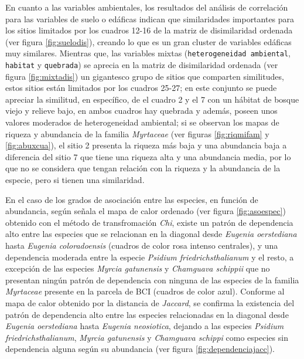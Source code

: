 \documentclass[11pt,]{article}
\begin{document}
En cuanto a las variables ambientales, los resultados del análisis de
correlación para las variables de suelo o edáficas indican que
similaridades importantes para los sitios limitados por los cuadros
12-16 de la matriz de disimilaridad ordenada (ver figura
\ref{fig:suelodis}), creando lo que es un gran cluster de variables
edáficas muy similares. Mientras que, las variables mixtas
(\texttt{heterogeneidad\ ambiental}, \texttt{habitat} y
\texttt{quebrada}) se aprecia en la matriz de disimilaridad ordenada
(ver figura \ref{fig:mixtadis}) un gigantesco grupo de sitios que
comparten similitudes, estos sitios están limitados por los cuadros
25-27; en este conjunto se puede apreciar la similitud, en específico,
de el cuadro 2 y el 7 con un hábitat de bosque viejo y relieve bajo, en
ambos cuadros hay quebrada y además, poseen unos valores moderados de
heterogeneidad ambiental; si se observan los mapas de riqueza y
abundancia de la familia \emph{Myrtaceae} (ver figuras
\ref{fig:riqmifam} y \ref{fig:abuxcua}), el sitio 2 presenta la riqueza
más baja y una abundancia baja a diferencia del sitio 7 que tiene una
riqueza alta y una abundancia media, por lo que no se considera que
tengan relación con la riqueza y la abundancia de la especie, pero si
tienen una similaridad.

En el caso de los grados de asociación entre las especies, en función de
abundancia, según señala el mapa de calor ordenado (ver figura
\ref{fig:asoespec}) obtenido con el método de transfromación \emph{Chi},
existe un patrón de dependencia alto entre las especies que se
relacionan en la diagonal desde \emph{Eugenia oerstediana} hasta
\emph{Eugenia coloradoensis} (cuadros de color rosa intenso centrales),
y una dependencia moderada entre la especie \emph{Psidium
friedrichsthalianum} y el resto, a excepción de las especies
\emph{Myrcia gatunensis} y \emph{Chamguava schippii} que no presentan
ningún patrón de dependencia con ninguna de las especies de la familia
\emph{Myrtaceae} presente en la parcela de BCI (cuadros de color azul).
Conforme al mapa de calor obtenido por la distancia de \emph{Jaccard},
se confirma la existencia del patrón de dependencia alto entre las
especies relacionadas en la diagonal desde \emph{Eugenia oerstediana}
hasta \emph{Eugenia neosiotica}, dejando a las especies \emph{Psidium
friedrichsthalianum}, \emph{Myrcia gatunensis} y \emph{Chamguava
schippi} como especies sin dependencia alguna según su abundancia (ver
figura \ref{fig:dependenciajacc}).
\end{document}
